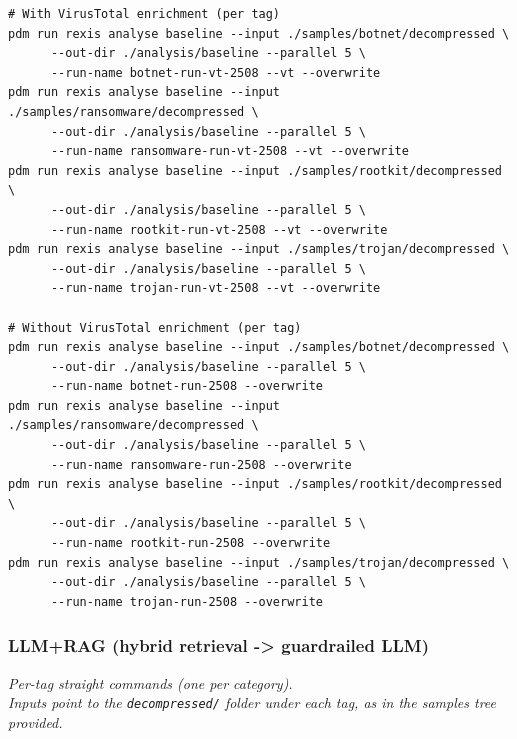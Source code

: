 \begin{verbatim}
# With VirusTotal enrichment (per tag)
pdm run rexis analyse baseline --input ./samples/botnet/decompressed \
      --out-dir ./analysis/baseline --parallel 5 \
      --run-name botnet-run-vt-2508 --vt --overwrite
pdm run rexis analyse baseline --input ./samples/ransomware/decompressed \
      --out-dir ./analysis/baseline --parallel 5 \
      --run-name ransomware-run-vt-2508 --vt --overwrite
pdm run rexis analyse baseline --input ./samples/rootkit/decompressed \
      --out-dir ./analysis/baseline --parallel 5 \
      --run-name rootkit-run-vt-2508 --vt --overwrite
pdm run rexis analyse baseline --input ./samples/trojan/decompressed \
      --out-dir ./analysis/baseline --parallel 5 \
      --run-name trojan-run-vt-2508 --vt --overwrite

# Without VirusTotal enrichment (per tag)
pdm run rexis analyse baseline --input ./samples/botnet/decompressed \
      --out-dir ./analysis/baseline --parallel 5 \
      --run-name botnet-run-2508 --overwrite
pdm run rexis analyse baseline --input ./samples/ransomware/decompressed \
      --out-dir ./analysis/baseline --parallel 5 \
      --run-name ransomware-run-2508 --overwrite
pdm run rexis analyse baseline --input ./samples/rootkit/decompressed \
      --out-dir ./analysis/baseline --parallel 5 \
      --run-name rootkit-run-2508 --overwrite
pdm run rexis analyse baseline --input ./samples/trojan/decompressed \
      --out-dir ./analysis/baseline --parallel 5 \
      --run-name trojan-run-2508 --overwrite
\end{verbatim}

\subsubsection{LLM+RAG (hybrid retrieval -> guardrailed LLM)}\label{subsubsec:LLMRAGExecution}
\noindent\textit{Per-tag straight commands (one per category).}\\ \noindent\textit{Inputs point to
      the \texttt{decompressed/} folder under each tag, as in the samples tree provided.}

